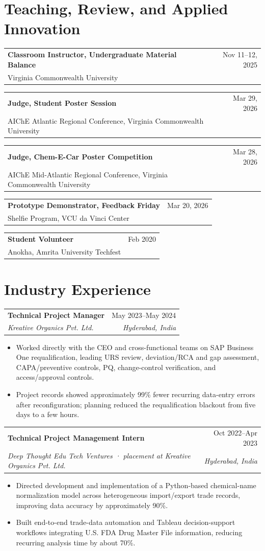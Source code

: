 \documentclass[10pt,letterpaper]{article}
\makeatletter
\newcommand{\entry}[4]{%
  \begin{tabularx}{\textwidth}{@{}Xr@{}}
    {\bfseries\color{Ink} #1} & {\color{Muted}\small #2}\\
    {\itshape #3} & {\itshape\color{Muted}\small #4}
  \end{tabularx}\vspace{1pt}
}
\newcommand{\smallentry}[3]{%
  \begin{tabularx}{\textwidth}{@{}Xr@{}}
    {\bfseries #1} & {\color{Muted}\small #2}\\
    {\small #3} &
  \end{tabularx}\vspace{1pt}
}
\makeatother
\begin{document}
\section{Teaching, Review, and Applied Innovation}
\smallentry{Classroom Instructor, Undergraduate Material Balance}{Nov 11–12, 2025}{Virginia Commonwealth University}
\smallentry{Judge, Student Poster Session}{Mar 29, 2026}{AIChE Atlantic Regional Conference, Virginia Commonwealth University}
\smallentry{Judge, Chem-E-Car Poster Competition}{Mar 28, 2026}{AIChE Mid-Atlantic Regional Conference, Virginia Commonwealth University}
\smallentry{Prototype Demonstrator, Feedback Friday}{Mar 20, 2026}{Shelfie Program, VCU da Vinci Center}
\smallentry{Student Volunteer}{Feb 2020}{Anokha, Amrita University Techfest}

\section{Industry Experience}
\entry{Technical Project Manager}{May 2023–May 2024}{Kreative Organics Pvt. Ltd.}{Hyderabad, India}
\begin{itemize}
  \item Worked directly with the CEO and cross-functional teams on SAP Business One requalification, leading URS review, deviation/RCA and gap assessment, CAPA/preventive controls, PQ, change-control verification, and access/approval controls.
  \item Project records showed approximately 99\% fewer recurring data-entry errors after reconfiguration; planning reduced the requalification blackout from five days to a few hours.
\end{itemize}

\entry{Technical Project Management Intern}{Oct 2022–Apr 2023}{Deep Thought Edu Tech Ventures · placement at Kreative Organics Pvt. Ltd.}{Hyderabad, India}
\begin{itemize}
  \item Directed development and implementation of a Python-based chemical-name normalization model across heterogeneous import/export trade records, improving data accuracy by approximately 90\%.
  \item Built end-to-end trade-data automation and Tableau decision-support workflows integrating U.S. FDA Drug Master File information, reducing recurring analysis time by about 70\%.
\end{itemize}
\end{document}
